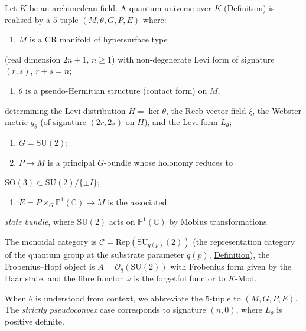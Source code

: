 \begin{example}
  \label{ex:c-quantum-universe}
Let $K$ be an archimedean field.  A quantum universe over $K$
(\hyperref[def:quantum-universe]{Definition}) is realised by a $5$-tuple
$(M, \theta, G, P, E)$ where:

\begin{enumerate}
  \item $M$ is a CR manifold of hypersurface type
\end{enumerate}
   (real dimension $2n+1$, $n \geq 1$) with non-degenerate Levi form
   of signature $(r,s)$, $r + s = n$;
\begin{enumerate}
  \item $\theta$ is a pseudo-Hermitian structure (contact form) on $M$,
\end{enumerate}
   determining the Levi distribution $H = \ker\theta$, the Reeb vector
   field $\xi$, the Webster metric $g_\theta$ (of signature $(2r,2s)$
   on $H$), and the Levi form $L_\theta$;
\begin{enumerate}
  \item $G = \mathrm{SU}(2)$;
  \item $P \to M$ is a principal $G$-bundle whose holonomy reduces to
\end{enumerate}
   $\mathrm{SO}(3) \subset \mathrm{SU}(2)/\{\pm I\}$;
\begin{enumerate}
  \item $E = P \times_G \mathbb{P}^1(\mathbb{C}) \to M$ is the associated
\end{enumerate}
   \emph{state bundle}, where $\mathrm{SU}(2)$ acts on
   $\mathbb{P}^1(\mathbb{C})$ by Mobius transformations.

The monoidal category is $\mathcal{C} = \mathrm{Rep}(\mathrm{SU}_{q(p)}(2))$
(the representation category of the quantum group at the substrate
parameter $q(p)$, \hyperref[def:substrate-parameter]{Definition}), the
Frobenius--Hopf object is
$A = \mathcal{O}_q(\mathrm{SU}(2))$ with Frobenius form given by the
Haar state, and the fibre functor $\omega$ is the forgetful functor
to $K\text{-}\mathrm{Mod}$.
\end{example}

\begin{remark}
  \label{rem:notation-special-cases}
When $\theta$ is understood from context, we abbreviate the $5$-tuple to
$(M, G, P, E)$.  The \emph{strictly pseudoconvex} case corresponds to
signature $(n,0)$, where $L_\theta$ is positive definite.
\end{remark}

